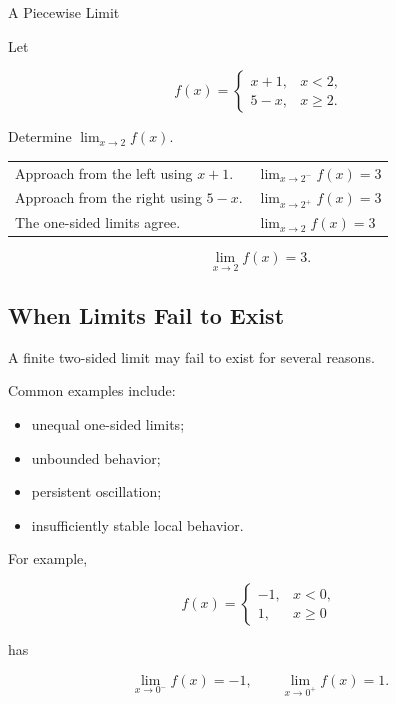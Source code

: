 \begin{workedexamplebox}{A Piecewise Limit}

Let

\[
f(x)=
\begin{cases}
x+1, & x<2,\\
5-x, & x\geq2.
\end{cases}
\]

Determine \(\lim_{x\to2}f(x)\).

\begin{tabularx}{\textwidth}{@{}>{\raggedright\arraybackslash}p{}X@{}}
Approach from the left using \(x+1\). &
\(\displaystyle \lim_{x\to2^-}f(x)=3\)\\
Approach from the right using \(5-x\). &
\(\displaystyle \lim_{x\to2^+}f(x)=3\)\\
The one-sided limits agree. &
\(\displaystyle \lim_{x\to2}f(x)=3\)
\end{tabularx}

\begin{answerbox}
\[ \boxed{\lim_{x\to2}f(x)=3.} \]
\end{answerbox}
\end{workedexamplebox}

\subsection{When Limits Fail to Exist}
\label{subsec:limits-dne}

A finite two-sided limit may fail to exist for several reasons.

Common examples include:

\begin{itemize}
    \item unequal one-sided limits;
    \item unbounded behavior;
    \item persistent oscillation;
    \item insufficiently stable local behavior.
\end{itemize}

For example,

\[
f(x)=
\begin{cases}
-1, & x<0,\\
1, & x\geq0
\end{cases}
\]

has

\[ \lim_{x\to0^-}f(x)=-1,\qquad
\lim_{x\to0^+}f(x)=1. \]

